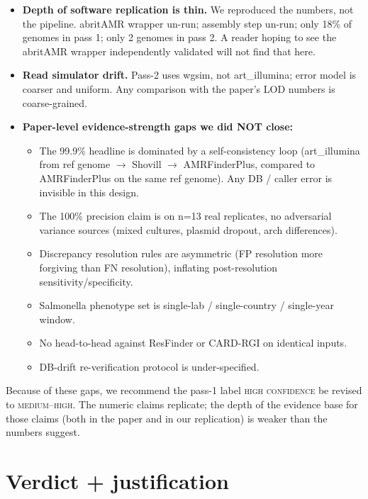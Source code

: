 \documentclass[11pt,a4paper]{article}
\begin{document}
\begin{itemize}[leftmargin=1.5em]
  \item \textbf{Depth of software replication is thin.} We reproduced the numbers, not the pipeline. abritAMR wrapper un-run; assembly step un-run; only 18\% of genomes in pass 1; only 2 genomes in pass 2. A reader hoping to see the abritAMR wrapper independently validated will not find that here.
  \item \textbf{Read simulator drift.} Pass-2 uses wgsim, not art\_illumina; error model is coarser and uniform. Any comparison with the paper's LOD numbers is coarse-grained.
  \item \textbf{Paper-level evidence-strength gaps we did NOT close:}
    \begin{itemize}[leftmargin=1.5em, itemsep=0pt]
      \item The 99.9\% headline is dominated by a self-consistency loop (art\_illumina from ref genome $\to$ Shovill $\to$ AMRFinderPlus, compared to AMRFinderPlus on the same ref genome). Any DB / caller error is invisible in this design.
      \item The 100\% precision claim is on n=13 real replicates, no adversarial variance sources (mixed cultures, plasmid dropout, arch differences).
      \item Discrepancy resolution rules are asymmetric (FP resolution more forgiving than FN resolution), inflating post-resolution sensitivity/specificity.
      \item Salmonella phenotype set is single-lab / single-country / single-year window.
      \item No head-to-head against ResFinder or CARD-RGI on identical inputs.
      \item DB-drift re-verification protocol is under-specified.
    \end{itemize}
\end{itemize}

Because of these gaps, we recommend the pass-1 label \textsc{high confidence} be revised to \textsc{medium--high}. The numeric claims replicate; the depth of the evidence base for those claims (both in the paper and in our replication) is weaker than the numbers suggest.

\section{Verdict + justification}
\end{document}
